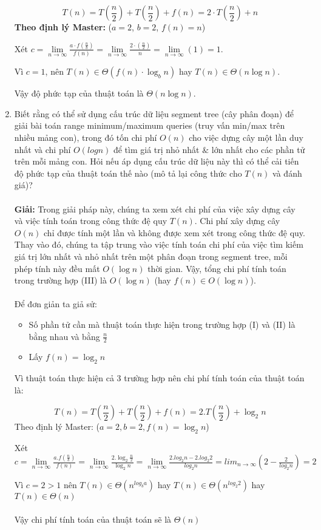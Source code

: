 \documentclass[12pt,a4paper]{article}
\begin{document}
\begin{enumerate}[label=\textbf{Câu 2.\arabic*},leftmargin=*]
          $$T(n) = T\left(\frac{n}{2}\right) + T\left(\frac{n}{2}\right) + f(n) = 2 \cdot T\left(\frac{n}{2}\right) + n$$
          \textbf{Theo định lý Master:} ($a = 2$, $b = 2$, $f(n) = n$)

          Xét $c = \lim\limits_{n \to \infty}\frac{a \cdot f(\frac{n}{b})}{f(n)} =
              \lim\limits_{n \to \infty}\frac{2 \cdot (\frac{n}{2})}{n} = \lim\limits_{n \to \infty}(1) = 1$.

          Vì $c=1$, nên $T(n) \in \Theta(f(n) \cdot \log_{b}n)$ hay $T(n) \in \Theta(n
              \log n)$.

          Vậy độ phức tạp của thuật toán là $\Theta(n \log n)$.
    \item Biết rằng có thể sử dụng cấu trúc dữ liệu segment tree (cây phân đoạn) để giải bài toán range minimum/maximum queries (truy vấn min/max trên nhiều mảng con), trong đó tốn chi phí $O(n)$ cho việc dựng cây một lần duy nhất và chi phí $O(logn)$ để tìm giá trị nhỏ nhất $\&$ lớn nhất cho các phần tử trên mỗi mảng con. Hỏi nếu áp dụng cấu trúc dữ liệu này thì có thể cải tiến độ phức tạp của thuật toán thế nào (mô tả lại công thức cho $T(n)$ và đánh giá)?  \\ \\ 
          \textbf{Giải:}
          Trong giải pháp này, chúng ta xem xét chi phí của việc xây dựng cây và việc tính toán trong công thức đệ quy $T(n)$. Chi phí xây dựng cây $O(n)$ chỉ được tính một lần và không được xem xét trong công thức đệ quy. Thay vào đó, chúng ta tập trung vào việc tính toán chi phí của việc tìm kiếm giá trị lớn nhất và nhỏ nhất trên một phân đoạn trong segment tree, mỗi phép tính này đều mất $O(\log n)$ thời gian. Vậy, tổng chi phí tính toán trong trường hợp (III) là $O(\log n)$ (hay $f(n) \in O(\log n)$).\\ \\
          Để đơn giản ta giả sử:
          \begin{itemize}
            \item Số phần tử cần mà thuật toán thực hiện trong trường hợp (I) và (II) là bằng nhau và bằng $\frac{n}{2}$
            \item Lấy $f(n) = \log_2 n$
          \end{itemize}
          Vì thuật toán thực hiện cả 3 trường hợp nên chi phí tính toán của thuật toán là:

        
$$T(n) = T(\frac{n}{2}) + T(\frac{n}{2}) + f(n) = 2.T(\frac{n}{2}) + \log_2 n $$
Theo định lý Master: ($a = 2, b = 2, f(n) = \log_2 n$)

Xét $c = \lim\limits_{n \to \infty}\frac{a.f(\frac{n}{b})}{f(n)} = \lim\limits_{n \to \infty}\frac{2.\log_2 \frac{n}{2}} {\log_2 n} = \lim\limits_{n \to \infty}\frac{2.log_2 n - 2.log_2 2} {log_2 n} = lim_{n\to\infty} (2 - \frac{2}{log_2 n}) = 2$

Vì $c=2 > 1$ nên $T(n) \in \Theta (n^{log_{b}a})$  hay $T(n) \in \Theta(n^{log_2 2} )$ hay $T(n) \in \Theta(n)$\\ \\
Vậy chi phí tính toán của thuật toán sẽ là $\Theta(n)$
        \end{enumerate}
\end{document}
